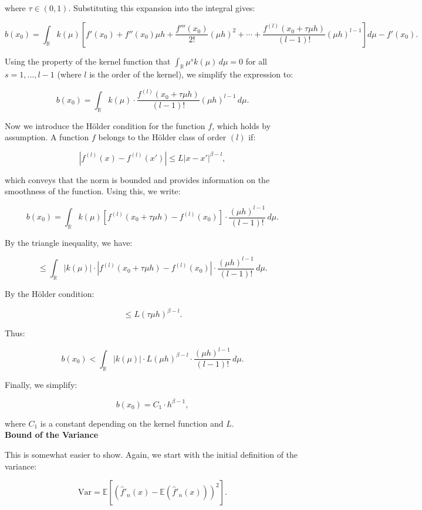 \documentclass{article}
\begin{document}
where \(\tau \in (0, 1)\). Substituting this expansion into the integral gives:

\[
b(x_0) = \int_{\mathbb{R}} k(\mu) \left[f'(x_0) + f''(x_0) \mu h + \frac{f'''(x_0)}{2!} (\mu h)^2 + \cdots + \frac{f^{(l)}(x_0 + \tau \mu h)}{(l-1)!} (\mu h)^{l-1} \right] d\mu - f'(x_0).
\]

Using the property of the kernel function that \(\int_{\mathbb{R}} \mu^s k(\mu) \, d\mu = 0\) for all \(s = 1, \dots, l-1\) (where \(l\) is the order of the kernel), we simplify the expression to:

\[
b(x_0) = \int_{\mathbb{R}} k(\mu) \cdot \frac{f^{(l)}(x_0 + \tau \mu h)}{(l-1)!} (\mu h)^{l-1} \, d\mu.
\]

Now we introduce the Hölder condition for the function \(f\), which holds by assumption. A function \(f\) belongs to the Hölder class of order \((l)\) if:

\[
|f^{(l)}(x) - f^{(l)}(x')| \leq L |x - x'|^{\beta - l},
\]

which conveys that the norm is bounded and provides information on the smoothness of the function. Using this, we write:

\[
b(x_0) = \int_{\mathbb{R}} k(\mu) \left[f^{(l)}(x_0 + \tau \mu h) - f^{(l)}(x_0)\right] \cdot \frac{(\mu h)^{l-1}}{(l-1)!} \, d\mu.
\]

By the triangle inequality, we have:

\[
\leq \int_{\mathbb{R}} |k(\mu)| \cdot \left|f^{(l)}(x_0 + \tau \mu h) - f^{(l)}(x_0)\right| \cdot \frac{(\mu h)^{l-1}}{(l-1)!} \, d\mu.
\]

By the Hölder condition:

\[
\leq L (\tau \mu h)^{\beta - l}.
\]

Thus:

\[
b(x_0) < \int_{\mathbb{R}} |k(\mu)| \cdot L (\mu h)^{\beta - l} \cdot \frac{(\mu h)^{l-1}}{(l-1)!} \, d\mu.
\]

Finally, we simplify:

\[
b(x_0) = C_1 \cdot h^{\beta - 1},
\]

where \(C_1\) is a constant depending on the kernel function and \(L\). \\



\textbf{Bound of the Variance}

This is somewhat easier to show. Again, we start with the initial definition of the variance:

\[
\text{Var} = \mathbb{E}\left[\left(\hat{f}'_n(x) - \mathbb{E}(\hat{f}'_n(x))\right)^2\right].
\]
\end{document}

